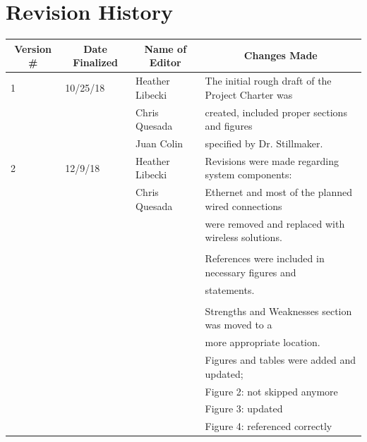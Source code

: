 \maketitle									%
\thispagestyle{empty}						%
\newpage
\thispagestyle{empty}

 \section*{Revision History}
\begin{table} [H]	
	\normalsize
	\centering
	\begin{tabular}{|l|l|l|l|}
		\hline
		\multicolumn{1}{|c|}{\textbf{Version \#}} & 
		\multicolumn{1}{|c|}{\textbf{Date Finalized}} &
		\multicolumn{1}{|c|}{\textbf{Name of Editor}} & 
		\multicolumn{1}{|c|}{\textbf{Changes Made}} \\
		\hline
	  1 & 10/25/18 	 & Heather Libecki                 & The initial rough draft of the Project Charter was \\ 
	     &			 & Chris Quesada   		   & created, included proper sections and figures \\ 
	     &			 & Juan Colin     		   & specified by Dr. Stillmaker.\\
		\hline
	   2 & 12/9/18 	 & Heather Libecki  		   & Revisions were made regarding system components:\\ 
	      &			 & Chris Quesada  		   & Ethernet and most of the planned wired connections\\
	      &			 &				   & were removed and replaced with wireless solutions. \\ 
	      &			 &				   & 	\\
	      &			 &				   & References were included in necessary figures and \\
	      &			 &				   & statements. \\
	      &			 &				   & 	\\
	      &			 &				   & Strengths and Weaknesses section was moved to a \\
	      &			 &				   & more appropriate location.\\
	      &			 &				   & Figures and tables were added and updated;\\
	      &			 &				   & Figure 2: not skipped anymore\\
	      &         		 &                			   & Figure 3: updated\\
	      &			 &				   & Figure 4: referenced correctly\\

\end{tabular}
\end{table}
